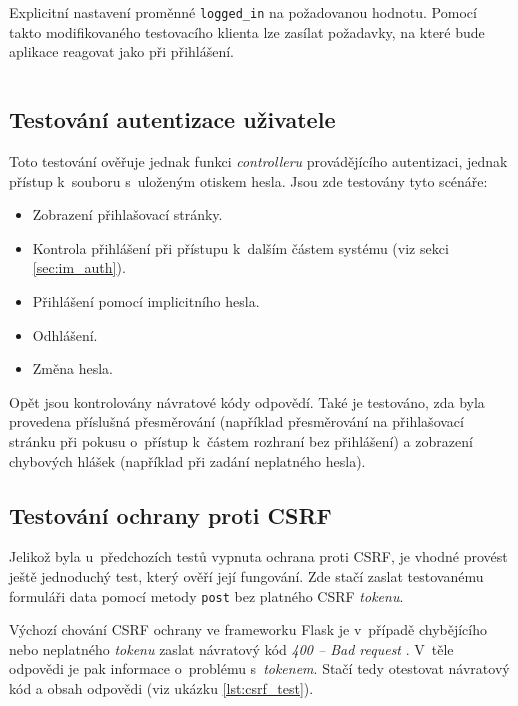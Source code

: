\begin{listing}[htbp]
\caption{\label{lst:logged_in} Explicitní nastavení proměnné \texttt{logged\_in} na požadovanou hodnotu. Pomocí takto modifikovaného testovacího klienta lze zasílat požadavky, na které bude aplikace reagovat jako při přihlášení.}
\inputminted[bgcolor=codebg]{python}{source-samples/logged_in.py}
\end{listing}

\subsection{Testování autentizace uživatele}

Toto testování ověřuje jednak funkci \textit{controlleru} provádějícího autentizaci, jednak přístup k~souboru s~uloženým otiskem hesla. Jsou zde testovány tyto scénáře:

\begin{itemize}
    \item Zobrazení přihlašovací stránky.
    \item Kontrola přihlášení při přístupu k~dalším částem systému (viz sekci \ref{sec:im_auth}).
    \item Přihlášení pomocí implicitního hesla.
    \item Odhlášení.
    \item Změna hesla.
\end{itemize}

Opět jsou kontrolovány návratové kódy odpovědí. Také je testováno, zda byla provedena příslušná přesměrování (například přesměrování na přihlašovací stránku při pokusu o~přístup k~částem rozhraní bez přihlášení) a zobrazení chybových hlášek (například při zadání neplatného hesla).

\subsection{Testování ochrany proti CSRF}
\label{sec:te_csrf}

Jelikož byla u~předchozích testů vypnuta ochrana proti CSRF, je vhodné provést ještě jednoduchý test, který ověří její fungování. Zde stačí zaslat testovanému formuláři data pomocí metody \texttt{post} bez platného CSRF \textit{tokenu}.

Výchozí chování CSRF ochrany ve frameworku Flask je v~případě chybějícího nebo neplatného \textit{tokenu} zaslat návratový kód \textit{400 -- Bad request} \cite{flask_wtf}. V~těle odpovědi je pak informace o~problému s~\textit{tokenem}. Stačí tedy otestovat návratový kód a obsah odpovědi (viz ukázku \ref{lst:csrf_test}).


